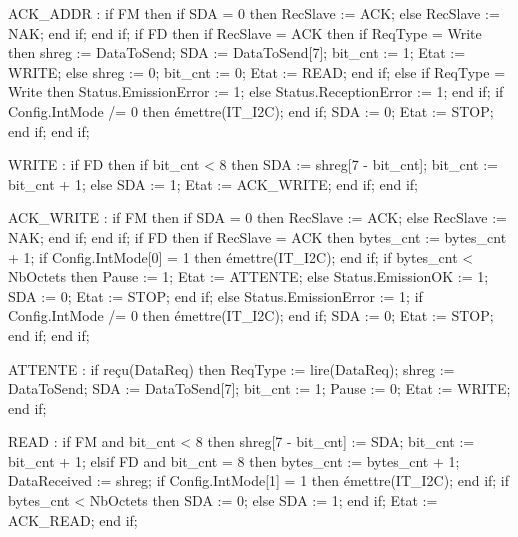\begin{VHDLcode}[caption={Algorithme de la fonction EmissionReceptionI2C}, label={lst:v}]
          ACK_ADDR :
            if FM then
              if SDA = 0 then RecSlave := ACK; else RecSlave := NAK; end if;
            end if;
            if FD then
              if RecSlave = ACK then
                if ReqType = Write then
                  shreg := DataToSend;
                  SDA := DataToSend[7]; bit_cnt := 1;
                  Etat := WRITE;
                else
                  shreg := 0; bit_cnt := 0;            
                  Etat := READ;
                end if;
              else                                     
                if ReqType = Write then Status.EmissionError := 1;
                else Status.ReceptionError := 1; end if;
                if Config.IntMode /= 0 then émettre(IT_I2C); end if;
                SDA := 0; Etat := STOP;
              end if;
            end if;

          WRITE :
            if FD then
              if bit_cnt < 8 then
                SDA := shreg[7 - bit_cnt]; bit_cnt := bit_cnt + 1;
              else
                SDA := 1;
                Etat := ACK_WRITE;
              end if;
            end if;

          ACK_WRITE :
            if FM then
              if SDA = 0 then RecSlave := ACK; else RecSlave := NAK; end if;
            end if;
            if FD then
              if RecSlave = ACK then
                bytes_cnt := bytes_cnt + 1;
                if Config.IntMode[0] = 1 then émettre(IT_I2C); end if;   
                if bytes_cnt < NbOctets then
                  Pause := 1;                        
                  Etat := ATTENTE;
                else
                  Status.EmissionOK := 1;
                  SDA := 0; Etat := STOP;
                end if;
              else
                Status.EmissionError := 1;
                if Config.IntMode /= 0 then émettre(IT_I2C); end if;
                SDA := 0; Etat := STOP;
              end if;
            end if;

          ATTENTE :                                    
            if reçu(DataReq) then
              ReqType := lire(DataReq);
              shreg := DataToSend;
              SDA := DataToSend[7]; bit_cnt := 1;
              Pause := 0;
              Etat := WRITE;
            end if;

          READ :
            if FM and bit_cnt < 8 then
              shreg[7 - bit_cnt] := SDA;               
              bit_cnt := bit_cnt + 1;
            elsif FD and bit_cnt = 8 then
              bytes_cnt := bytes_cnt + 1;
              DataReceived := shreg;
              if Config.IntMode[1] = 1 then émettre(IT_I2C); end if;    
              if bytes_cnt < NbOctets then SDA := 0;   
              else SDA := 1; end if;                  
              Etat := ACK_READ;
            end if;


\end{VHDLcode}
